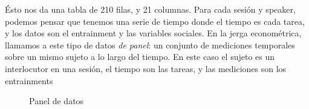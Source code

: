 Ésto nos da una tabla de 210 filas, y 21 columnas. Para cada sesión y speaker, podemos pensar que tenemos una serie de tiempo donde el tiempo es cada tarea, y los datos son el entrainment y las variables sociales. En la jerga econométrica, llamamos a este tipo de datos \emph{de panel}\cite{gujarati1999}: un conjunto de mediciones temporales sobre un mismo sujeto a lo largo del tiempo. En este caso el sujeto es un interlocutor en una sesión, el tiempo son las tareas, y las mediciones son los entrainments


\begin{figure}
\centering

\caption{Panel de datos}
\label{panel_data}
\end{figure}
